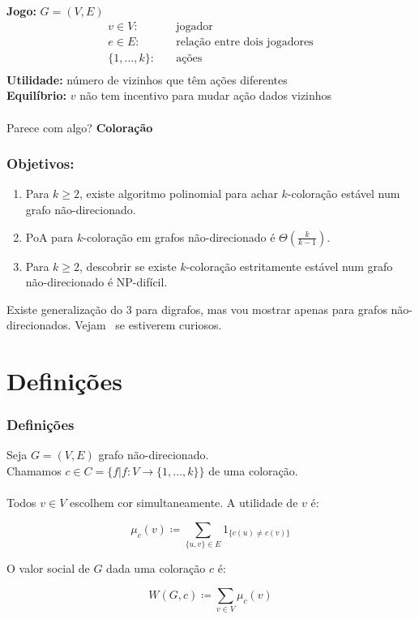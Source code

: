 \documentclass{beamer}
\theoremstyle{plain}
\newcommand{\p}{\pause}
\begin{document}
\begin{frame}
  \textbf{Jogo:} $G=(V,E)$\\
  \begin{align*}
    v\in V:\quad &\text{jogador}\\
    e\in E:\quad &\text{relação entre dois jogadores}\\
    \{1,\ldots,k\}:\quad &\text{ações}\\
  \end{align*}
  \textbf{Utilidade:} número de vizinhos que têm ações diferentes\\
  \textbf{Equilíbrio:} $v$ não tem incentivo para mudar ação dados vizinhos\p\\~\\

  Parece com algo? \p \textbf{Coloração}
\end{frame}

\begin{frame}
  \frametitle{Objetivos:}
  \begin{enumerate}
    \item Para $k\geq 2$, existe algoritmo polinomial para achar $k$-coloração estável num grafo
      não-direcionado.\p
    \item PoA para $k$-coloração em grafos não-direcionado é $\Theta\left(\frac{k}{k-1}\right)$.\p
    \item Para $k\geq 2$, descobrir se existe $k$-coloração estritamente estável num grafo
      não-direcionado é NP-difícil.\p
  \end{enumerate}

  Existe generalização do 3 para digrafos, mas vou mostrar apenas para grafos não-direcionados.
  Vejam~\cite{kun-et-al} se estiverem curiosos.
\end{frame}

\section{Definições}

\begin{frame}
  \frametitle{Definições}
  Seja $G=(V,E)$ grafo não-direcionado.\\
  Chamamos $c\in C=\{f|f:V\to\{1,\ldots,k\}\}$ de uma coloração.\\~\\

  Todos $v\in V$ escolhem cor simultaneamente. A utilidade de $v$ é:

  \begin{equation*}
    \mu_c(v) \coloneqq \sum_{\{u,v\}\in E} 1_{\{c(u)\neq c(v)\}}
  \end{equation*}

  O valor social de $G$ dada uma coloração $c$ é:

  \begin{equation*}
    W(G,c)\coloneqq\sum_{v\in V}\mu_c(v)
  \end{equation*} 
\end{frame}
\end{document}

